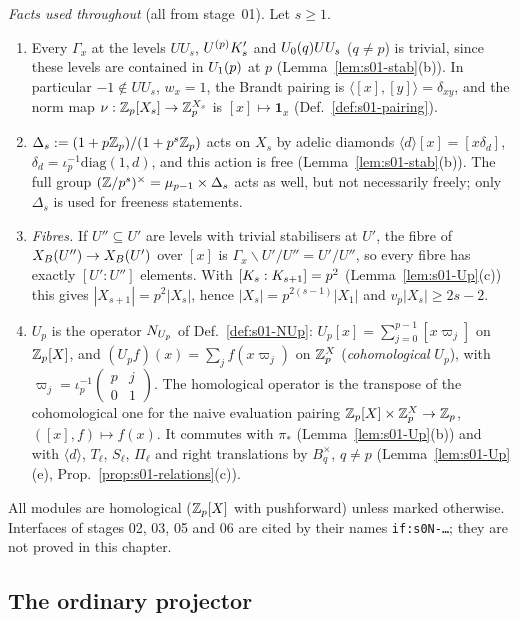 \emph{Facts used throughout} (all from stage~01). Let $s\ge1$.
\begin{enumerate}[label=(N\arabic*)]
\item Every $\Gamma_x$ at the levels $UU_s$, $U^{(p)}K'_{s}$ and $U_0(q)UU_s$ ($q\ne p$) is trivial, since these levels are contained in
  $U_1(p)$ at $p$ (Lemma~\ref{lem:s01-stab}(b)). In particular $-1\notin UU_s$, $w_x=1$, the Brandt pairing is
  $\langle[x],[y]\rangle=\delta_{xy}$, and the norm map $\nu:\mathbb{Z}_p[X_s]\to\mathbb{Z}_p^{X_s}$ is $[x]\mapsto\mathbf 1_x$
  (Def.~\ref{def:s01-pairing}).
\item $\Delta_s:=(1+p\mathbb{Z}_p)/(1+p^s\mathbb{Z}_p)$ acts on $X_s$ by adelic diamonds $\langle d\rangle[x]=[x\delta_d]$, $\delta_d=\iota_p^{-1}\mathrm{diag}(1,d)$,
  and this action is free (Lemma~\ref{lem:s01-stab}(b)). The full group $(\mathbb{Z}/p^s)^\times=\mu_{p-1}\times\Delta_s$ acts as well, but not
  necessarily freely; only $\Delta_s$ is used for freeness statements.
\item \emph{Fibres.} If $U''\subseteq U'$ are levels with trivial stabilisers at $U'$, the fibre of $X_B(U'')\to X_B(U')$ over $[x]$ is
  $\Gamma_x\backslash U'/U''=U'/U''$, so every fibre has exactly $[U':U'']$ elements. With $[K_{s}:K_{s+1}]=p^2$
  (Lemma~\ref{lem:s01-Up}(c)) this gives $|X_{s+1}|=p^2|X_s|$, hence $|X_s|=p^{2(s-1)}|X_1|$ and $v_p|X_s|\ge2s-2$.
\item $U_p$ is the operator $N_{U_p}$ of Def.~\ref{def:s01-NUp}: $U_p[x]=\sum_{j=0}^{p-1}[x\varpi_j]$ on $\mathbb{Z}_p[X]$, and
  $(U_pf)(x)=\sum_j f(x\varpi_j)$ on $\mathbb{Z}_p^X$ (\emph{cohomological} $U_p$), with
  $\varpi_j=\iota_p^{-1}\left(\begin{smallmatrix}p&j\\0&1\end{smallmatrix}\right)$. The homological operator is the transpose of the
  cohomological one for the naive evaluation pairing $\mathbb{Z}_p[X]\times\mathbb{Z}_p^X\to\mathbb{Z}_p$, $([x],f)\mapsto f(x)$. It commutes with $\pi_*$
  (Lemma~\ref{lem:s01-Up}(b)) and with $\langle d\rangle$, $T_\ell$, $S_\ell$, $\Pi_\ell$ and right translations by $B_q^\times$, $q\ne p$
  (Lemma~\ref{lem:s01-Up}(e), Prop.~\ref{prop:s01-relations}(c)).
\end{enumerate}
All modules are homological ($\mathbb{Z}_p[X]$ with pushforward) unless marked otherwise. Interfaces of stages 02, 03, 05 and 06 are cited
by their names \texttt{if:s0N-\dots}; they are not proved in this chapter.

\subsection{The ordinary projector}

